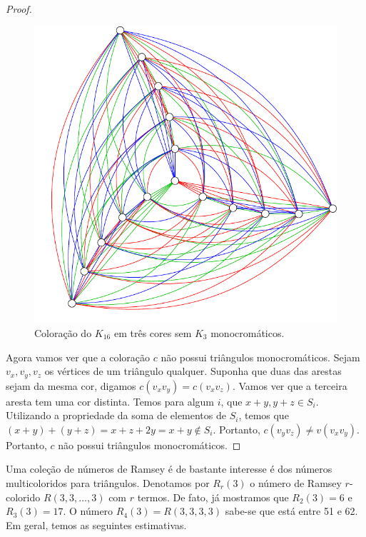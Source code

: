 \begin{proof}
\begin{figure}[ht!]
\centering
\includegraphics{figures/2_prelim_3_r333lb}
\caption{Coloração do $K_{16}$ em três cores sem $K_3$ monocromáticos.}
\label{prelim:fig:exr333}
\end{figure}

Agora vamos ver que a coloração $c$ não possui triângulos monocromáticos.
Sejam $v_x, v_y, v_z$ os vértices de um triângulo qualquer. Suponha que duas das arestas sejam da mesma cor, digamos $c(v_x v_y) = c(v_x v_z)$. Vamos ver que a terceira aresta tem uma cor distinta. Temos para algum $i$, que $x + y, y + z \in S_i$. Utilizando a propriedade da soma de elementos de $S_i$, temos que $(x + y) + (y  + z) = x + z + 2y = x + y \not\in S_i$. Portanto, $c(v_y v_z) \neq v(v_x v_y)$. Portanto, $c$ não possui triângulos monocromáticos.
\end{proof}

Uma coleção de números de Ramsey é de bastante interesse é dos números multicoloridos para triângulos. Denotamos por $R_r(3)$ o número de Ramsey $r$-colorido $R(3,3,\dots,3)$ com $r$ termos. De fato, já mostramos que $R_2(3) = 6$ e $R_3(3) = 17$. O número $R_4(3) = R(3,3,3,3)$ sabe-se que está entre 51 e 62. Em geral, temos as seguintes estimativas.

